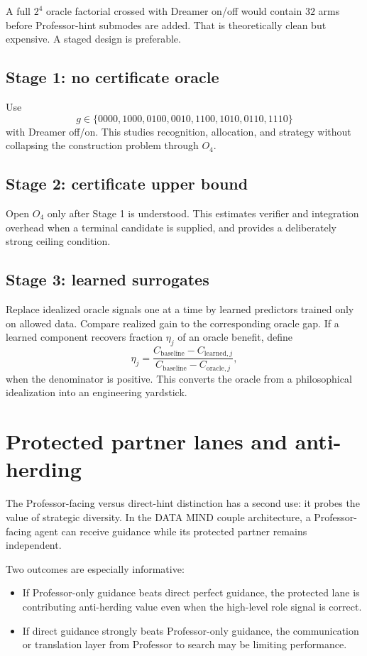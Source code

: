 A full $2^4$ oracle factorial crossed with Dreamer on/off would contain $32$ arms before Professor-hint submodes are added. That is theoretically clean but expensive. A staged design is preferable.

\subsection*{Stage 1: no certificate oracle}
Use
\begin{equation}
g\in\{0000,1000,0100,0010,1100,1010,0110,1110\}
\end{equation}
with Dreamer off/on. This studies recognition, allocation, and strategy without collapsing the construction problem through $O_4$.

\subsection*{Stage 2: certificate upper bound}
Open $O_4$ only after Stage 1 is understood. This estimates verifier and integration overhead when a terminal candidate is supplied, and provides a deliberately strong ceiling condition.

\subsection*{Stage 3: learned surrogates}
Replace idealized oracle signals one at a time by learned predictors trained only on allowed data. Compare realized gain to the corresponding oracle gap. If a learned component recovers fraction $\eta_j$ of an oracle benefit, define
\begin{equation}
\eta_j=
\frac{C_{\mathrm{baseline}}-C_{\mathrm{learned},j}}
{C_{\mathrm{baseline}}-C_{\mathrm{oracle},j}},
\end{equation}
when the denominator is positive. This converts the oracle from a philosophical idealization into an engineering yardstick.

\section{Protected partner lanes and anti-herding}

The Professor-facing versus direct-hint distinction has a second use: it probes the value of strategic diversity. In the DATA MIND couple architecture, a Professor-facing agent can receive guidance while its protected partner remains independent.

Two outcomes are especially informative:
\begin{itemize}
\item If Professor-only guidance beats direct perfect guidance, the protected lane is contributing anti-herding value even when the high-level role signal is correct.
\item If direct guidance strongly beats Professor-only guidance, the communication or translation layer from Professor to search may be limiting performance.
\end{itemize}

